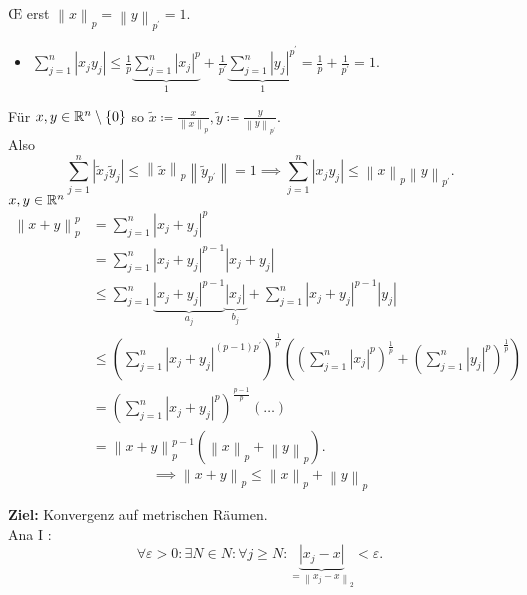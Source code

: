 \begin{subexample}[$ \R^n $, Normen]
\[	\]
	\OE{} erst $ \left\| x \right\| _p = \left\| y \right\| _{p^\prime } = 1 $.
	\begin{itemize}
		\item $ \sum_{j=1}^{n} \left| x_j y_j \right| \leq \frac{ 1 }{ p } \underbrace{\sum_{j=1}^{n} \left| x_j \right| ^p}_{1} + \frac{ 1 }{ p^\prime  } \underbrace{\sum_{j=1}^{n} \left| y_j \right| ^{p^\prime } }_{1} = \frac{ 1 }{ p } + \frac{ 1 }{ p^\prime  } = 1 $.
	\end{itemize}
	Für $ x, y \in \mathbb{R} ^n \setminus \left\{ 0 \right\}  $ so $ \tilde{x} \coloneqq \frac{ x }{ \left\| x \right\| _p } , \tilde{y} \coloneqq \frac{ y }{ \left\| y \right\| _{p^\prime }  }  $.\\
	Also
	\[
		\sum_{j=1}^{n} \left| \tilde{x}_j \tilde{y}_j \right| \leq \left\| \tilde{x} \right\| _p \left\| \tilde{y}_{p^\prime }  \right\| = 1 \implies \sum_{j=1}^{n} \left| x_j y_j \right| \leq \left\| x \right\| _p \left\| y \right\| _{p^\prime } .
	\]
	$ x, y \in \mathbb{R} ^n $ 
	\begin{align*}
		\left\| x + y \right\| _p^p &= \sum_{j=1}^{n} \left| x_j + y_j \right| ^p \\
		~ &= \sum_{j=1}^{n} \left| x_j + y_j \right| ^{p - 1} \left| x_j + y_j \right|  \\
		~ &\leq \sum_{j=1}^{n} \underbrace{\left| x_j + y_j \right| ^{p - 1} }_{a_j} \underbrace{\left| x_j \right|}_{b_j}  + \sum_{j=1}^{n} \left| x_j + y_j \right| ^{p -1} \left| y_j \right| \\
		~ & \leq \left( \sum_{j=1}^{n} \left| x_j + y_j \right| ^{( p - 1) p^\prime }  \right) ^{\frac{ 1 }{ p^\prime  } } \left( \left( \sum_{j=1}^{n} \left| x_j \right| ^p \right) ^{\frac{ 1 }{ p } } + \left( \sum_{j=1}^{n} \left| y_j \right| ^p \right) ^{\frac{ 1 }{ p } }  \right) \\
		  ~ &= \left( \sum_{j=1}^{n} \left| x_j + y_j \right| ^p \right) ^{\frac{ p - 1 }{ p } } \left( \dotsc \right)  \\
		  ~ &= \left\| x + y \right\| _p ^{p - 1} \left( \left\| x \right\| _p + \left\| y \right\| _p \right) .
	\end{align*}
	\[
		  \implies \left\| x + y \right\| _p \leq  \left\| x \right\| _p + \left\| y \right\| _p
	\]
\end{subexample}

\textbf{Ziel:} Konvergenz auf metrischen Räumen.\\
Ana I : \[ \forall \varepsilon > 0 : \exists N \in N : \forall j \geq N : \underbrace{\left| x_j - x \right| }_{= \left\| x_j - x \right\| _2} < \varepsilon . \]

